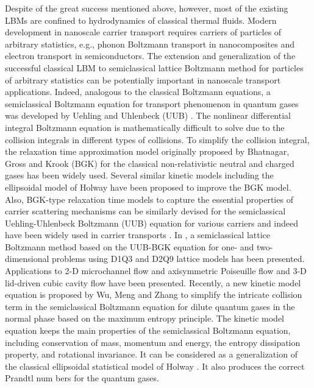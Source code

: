 \documentclass[doublecol]{epl2}
\begin{document}
Despite of the great success mentioned above, however, most of the existing LBMs are confined to hydrodynamics of classical thermal fluids.
Modern development in nanoscale carrier transport requires carriers of particles of arbitrary statistics, e.g., phonon Boltzmann transport in nanocomposites and electron transport in semiconductors. The extension and generalization of the successful classical LBM to semiclassical lattice Boltzmann method for particles of arbitrary statistics can be potentially important in nanoscale transport applications.  Indeed, analogous to the classical Boltzmann equations, a semiclassical Boltzmann equation for transport phenomenon in quantum gases was developed by Uehling and Uhlenbeck (UUB) \cite{Ueh1933}.   The nonlinear differential integral Boltzmann equation is mathematically difficult to solve due to the collision integrals in different types of collisions. To simplify the collision integral, the relaxation time approximation model originally proposed by Bhatnagar, Gross and Krook (BGK) \cite{BGK1954} for the classical non-relativistic neutral and charged gases has been widely used.  Several similar kinetic models including the ellipsoidal model of Holway \cite{Holway1962} have been proposed to improve the BGK model.  Also, BGK-type relaxation time models to capture the essential properties of carrier scattering mechanisms can be similarly devised for the semiclassical Uehling-Uhlenbeck Boltzmann (UUB) equation for various carriers and indeed have been widely used in carrier transports \cite{Lund2000, Chen2005, Kaviany2008}. In \cite{Yang2009}, a semiclassical lattice Boltzmann method based on the UUB-BGK equation for one- and two-dimensional problems using D1Q3 and D2Q9 lattice models has been presented.  Applications to 2-D microchannel flow and axisymmetric Poiseuille flow and 3-D lid-driven cubic cavity flow have been presented.  Recently, a new kinetic model equation is proposed by Wu, Meng and Zhang \cite{Wu2012} to simplify the intricate collision term in the semiclassical Boltzmann equation for dilute quantum gases in the normal phase based on the maximum entropy principle. The kinetic model equation keeps the main properties of the semiclassical Boltzmann equation, including conservation of mass, momentum and energy, the entropy dissipation property, and rotational invariance. It can be considered as a generalization of the classical ellipsoidal statistical model of Holway \cite{Holway1966}. It also produces the correct Prandtl num bers for the quantum gases.
\end{document}
